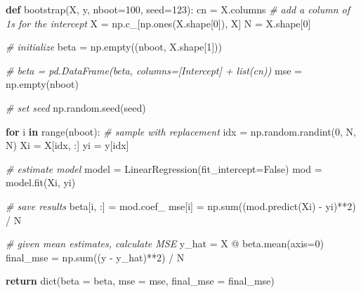 \documentclass[
  letterpaper,
]{krantz}
\newenvironment{Shaded}{}{}
\newcommand{\BuiltInTok}[1]{\textcolor[rgb]{0.00,0.50,0.00}{#1}}
\newcommand{\CommentTok}[1]{\textcolor[rgb]{0.38,0.63,0.69}{\textit{#1}}}
\newcommand{\ControlFlowTok}[1]{\textcolor[rgb]{0.00,0.44,0.13}{\textbf{#1}}}
\newcommand{\DecValTok}[1]{\textcolor[rgb]{0.25,0.63,0.44}{#1}}
\newcommand{\KeywordTok}[1]{\textcolor[rgb]{0.00,0.44,0.13}{\textbf{#1}}}
\newcommand{\NormalTok}[1]{#1}
\newcommand{\OperatorTok}[1]{\textcolor[rgb]{0.40,0.40,0.40}{#1}}
\newcommand{\VariableTok}[1]{\textcolor[rgb]{0.10,0.09,0.49}{#1}}
\begin{document}
\begin{Shaded}
\begin{Highlighting}[]
\KeywordTok{def}\NormalTok{ bootstrap(X, y, nboot}\OperatorTok{=}\DecValTok{100}\NormalTok{, seed}\OperatorTok{=}\DecValTok{123}\NormalTok{):}
\NormalTok{    cn }\OperatorTok{=}\NormalTok{ X.columns}
    \CommentTok{\# add a column of 1s for the intercept}
\NormalTok{    X }\OperatorTok{=}\NormalTok{ np.c\_[np.ones(X.shape[}\DecValTok{0}\NormalTok{]), X]}
\NormalTok{    N }\OperatorTok{=}\NormalTok{ X.shape[}\DecValTok{0}\NormalTok{]}

    \CommentTok{\# initialize}
\NormalTok{    beta }\OperatorTok{=}\NormalTok{ np.empty((nboot, X.shape[}\DecValTok{1}\NormalTok{]))}
    
    \CommentTok{\# beta = pd.DataFrame(beta, columns=[\textquotesingle{}Intercept\textquotesingle{}] + list(cn))}
\NormalTok{    mse }\OperatorTok{=}\NormalTok{ np.empty(nboot)    }

    \CommentTok{\# set seed}
\NormalTok{    np.random.seed(seed)}

    \ControlFlowTok{for}\NormalTok{ i }\KeywordTok{in} \BuiltInTok{range}\NormalTok{(nboot):}
        \CommentTok{\# sample with replacement}
\NormalTok{        idx }\OperatorTok{=}\NormalTok{ np.random.randint(}\DecValTok{0}\NormalTok{, N, N)}
\NormalTok{        Xi }\OperatorTok{=}\NormalTok{ X[idx, :]}
\NormalTok{        yi }\OperatorTok{=}\NormalTok{ y[idx]}

        \CommentTok{\# estimate model}
\NormalTok{        model }\OperatorTok{=}\NormalTok{ LinearRegression(fit\_intercept}\OperatorTok{=}\VariableTok{False}\NormalTok{)}
\NormalTok{        mod }\OperatorTok{=}\NormalTok{ model.fit(Xi, yi)}

        \CommentTok{\# save results}
\NormalTok{        beta[i, :] }\OperatorTok{=}\NormalTok{ mod.coef\_}
\NormalTok{        mse[i] }\OperatorTok{=}\NormalTok{ np.}\BuiltInTok{sum}\NormalTok{((mod.predict(Xi) }\OperatorTok{{-}}\NormalTok{ yi)}\OperatorTok{**}\DecValTok{2}\NormalTok{) }\OperatorTok{/}\NormalTok{ N}

    \CommentTok{\# given mean estimates, calculate MSE}
\NormalTok{    y\_hat }\OperatorTok{=}\NormalTok{ X }\OperatorTok{@}\NormalTok{ beta.mean(axis}\OperatorTok{=}\DecValTok{0}\NormalTok{)}
\NormalTok{    final\_mse }\OperatorTok{=}\NormalTok{ np.}\BuiltInTok{sum}\NormalTok{((y }\OperatorTok{{-}}\NormalTok{ y\_hat)}\OperatorTok{**}\DecValTok{2}\NormalTok{) }\OperatorTok{/}\NormalTok{ N}

    \ControlFlowTok{return} \BuiltInTok{dict}\NormalTok{(beta }\OperatorTok{=}\NormalTok{ beta, mse }\OperatorTok{=}\NormalTok{ mse, final\_mse }\OperatorTok{=}\NormalTok{ final\_mse)}


\end{Highlighting}
\end{Shaded}
\end{document}
